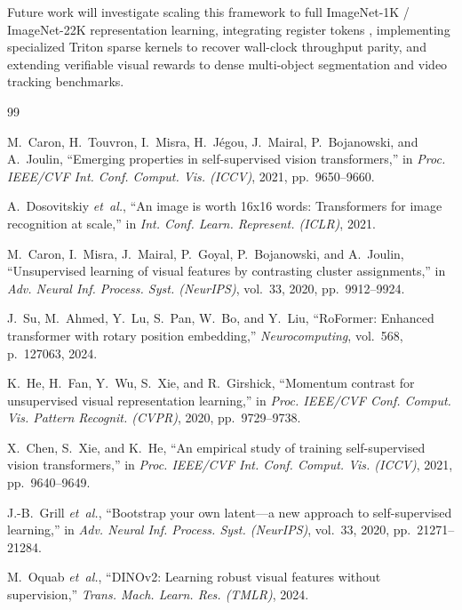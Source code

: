 \documentclass[11pt,a4paper]{article}
\begin{document}
Future work will investigate scaling this framework to full ImageNet-1K / ImageNet-22K representation learning, integrating register tokens \cite{darcet2024vision}, implementing specialized Triton sparse kernels to recover wall-clock throughput parity, and extending verifiable visual rewards to dense multi-object segmentation and video tracking benchmarks.

\begin{thebibliography}{99}

M.~Caron, H.~Touvron, I.~Misra, H.~J{\'e}gou, J.~Mairal, P.~Bojanowski, and A.~Joulin,
``Emerging properties in self-supervised vision transformers,''
in \emph{Proc. IEEE/CVF Int. Conf. Comput. Vis. (ICCV)}, 2021, pp.~9650--9660.

A.~Dosovitskiy \emph{et~al.},
``An image is worth 16x16 words: Transformers for image recognition at scale,''
in \emph{Int. Conf. Learn. Represent. (ICLR)}, 2021.

M.~Caron, I.~Misra, J.~Mairal, P.~Goyal, P.~Bojanowski, and A.~Joulin,
``Unsupervised learning of visual features by contrasting cluster assignments,''
in \emph{Adv. Neural Inf. Process. Syst. (NeurIPS)}, vol.~33, 2020, pp.~9912--9924.

J.~Su, M.~Ahmed, Y.~Lu, S.~Pan, W.~Bo, and Y.~Liu,
``RoFormer: Enhanced transformer with rotary position embedding,''
\emph{Neurocomputing}, vol.~568, p.~127063, 2024.

K.~He, H.~Fan, Y.~Wu, S.~Xie, and R.~Girshick,
``Momentum contrast for unsupervised visual representation learning,''
in \emph{Proc. IEEE/CVF Conf. Comput. Vis. Pattern Recognit. (CVPR)}, 2020, pp.~9729--9738.

X.~Chen, S.~Xie, and K.~He,
``An empirical study of training self-supervised vision transformers,''
in \emph{Proc. IEEE/CVF Int. Conf. Comput. Vis. (ICCV)}, 2021, pp.~9640--9649.

J.-B.~Grill \emph{et~al.},
``Bootstrap your own latent---a new approach to self-supervised learning,''
in \emph{Adv. Neural Inf. Process. Syst. (NeurIPS)}, vol.~33, 2020, pp.~21271--21284.

M.~Oquab \emph{et~al.},
``DINOv2: Learning robust visual features without supervision,''
\emph{Trans. Mach. Learn. Res. (TMLR)}, 2024.


\end{thebibliography}
\end{document}
